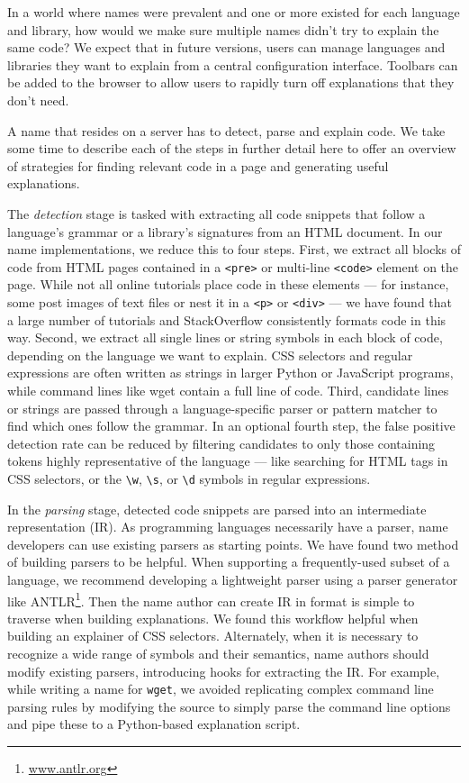 In a world where \glspl{name} were prevalent and one or more existed for each language and library, how would we make sure multiple \glspl{name} didn't try to explain the same code?
We expect that in future versions, users can manage languages and libraries they want to explain from a central configuration interface.
Toolbars can be added to the browser to allow users to rapidly turn off explanations that they don't need.

A \gls{name} that resides on a server has to detect, parse and explain code.
We take some time to describe each of the steps in further detail here to offer an overview of strategies for finding relevant code in a page and generating useful explanations.

The \emph{detection} stage is tasked with extracting all code snippets that follow a language's grammar or a library's signatures from an HTML document.
In our \gls{name} implementations, we reduce this to four steps.
First, we extract all blocks of code from HTML pages contained in a \texttt{<pre>} or multi-line \texttt{<code>} element on the page.
While not all online tutorials place code in these elements --- for instance, some post images of text files or nest it in a \texttt{<p>} or \texttt{<div>} --- we have found that a large number of tutorials and StackOverflow consistently formats code in this way.
Second, we extract all single lines or string symbols in each block of code, depending on the language we want to explain.
CSS selectors and regular expressions are often written as strings in larger Python or JavaScript programs, while command lines like wget contain a full line of code.
Third, candidate lines or strings are passed through a language-specific parser or pattern matcher to find which ones follow the grammar.
In an optional fourth step, the false positive detection rate can be reduced by filtering candidates to only those containing tokens highly representative of the language --- like searching for HTML tags in CSS selectors, or the \texttt{\textbackslash{}w}, \texttt{\textbackslash{}s}, or \texttt{\textbackslash{}d} symbols in regular expressions.

In the \emph{parsing} stage, detected code snippets are parsed into an intermediate representation (IR).
As programming languages necessarily have a parser, \gls{name} developers can use existing parsers as starting points.
We have found two method of building parsers to be helpful.
When supporting a frequently-used subset of a language, we recommend developing a lightweight parser using a parser generator like ANTLR\footnote{\url{www.antlr.org}}.
Then the \gls{name} author can create IR in format is simple to traverse when building explanations.
We found this workflow helpful when building an explainer of CSS selectors.
Alternately, when it is necessary to recognize a wide range of symbols and their semantics, \gls{name} authors should modify existing parsers, introducing hooks for extracting the IR.
For example, while writing a \gls{name} for \texttt{wget}, we avoided replicating complex command line parsing rules by modifying the source to simply parse the command line options and pipe these to a Python-based explanation script.

